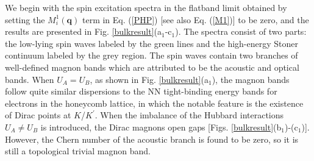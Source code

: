 \documentclass[amsmath,superscriptaddress,showpacs,aps,prl,twocolumn]{revtex4-1}
\begin{document}
\par We begin with the spin excitation spectra in the flatband limit obtained by setting the $M_i^1(\mathbf{q})$ term in Eq. (\ref{PHP}) [see also Eq. (\ref{M1})] to be zero, and the results are presented in Fig. \ref{bulkresult}(a$_1$-c$_1$). The spectra consist of two parts: the low-lying spin waves labeled by the green lines and the high-energy Stoner continuum labeled by the grey region. The spin waves contain two branches of well-defined magnon bands which are attributed to be the acoustic and optical bands. When $U_A=U_B$, as shown in Fig. \ref{bulkresult}(a$_1$), the magnon bands follow quite similar dispersions to the NN tight-binding energy bands for electrons in the honeycomb lattice, in which the notable feature is the existence of Dirac points at $K$/$K^\prime$. When the imbalance of the Hubbard interactions $U_A \ne U_B$ is introduced, the Dirac magnons open gaps [Figs. \ref{bulkresult}(b$_1$)-(c$_1$)]. However, the Chern number of the acoustic branch is found to be zero, so it is still a topological trivial magnon band.
\end{document}
